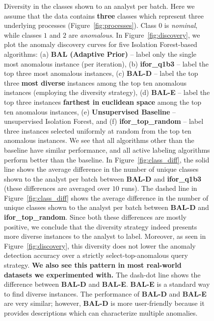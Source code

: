 \documentclass{article} %
\begin{document}
\begin{figure}
	\caption{Diversity in the classes shown to an analyst per batch. Here we assume that the data contains \textbf{three} classes which represent three underlying processes (Figure~\ref{fig:processes}). Class $0$ is \emph{nominal}, while classes $1$ and $2$ are \emph{anomalous}. In Figure~\ref{fig:discovery}, we plot the anomaly discovery curves for five Isolation Forest-based algorithms: (a) \textbf{BAL (Adaptive Prior)} -- label only the single most anomalous instance (per iteration), (b) \textbf{ifor\_q1b3} -- label the top three most anomalous instances, (c) \textbf{BAL-D} -- label the top three \textbf{most diverse} instances among the top ten anomalous instances (employing the diversity strategy), (d) \textbf{BAL-E} -- label the top three instances \textbf{farthest in euclidean space} among the top ten anomalous instances, (e) \textbf{Unsupervised Baseline} -- unsupervised Isolation Forest, and (f) \textbf{ifor\_top\_random} -- label three instances selected uniformly at random from the top ten anomalous instances. We see that all algorithms other than the baseline have similar performance, and all active labeling algorithms perform better than the baseline. In Figure~\ref{fig:class_diff}, the solid line shows the average difference in the number of unique classes shown to the analyst per batch between \textbf{BAL-D} and \textbf{ifor\_q1b3} (these differences are averaged over $10$ runs). The dashed line in Figure~\ref{fig:class_diff} shows the average difference in the number of unique classes shown to the analyst per batch between \textbf{BAL-D} and \textbf{ifor\_top\_random}. Since both these differences are mostly positive, we conclude that the diversity strategy indeed presents more diverse instances to the analyst to label. Moreover, as seen in Figure~\ref{fig:discovery}, this diversity does not lower the anomaly detection accuracy over a strictly select-top-anomalous query strategy. \textbf{We also see this pattern in most real-world datasets we experimented with.} The dash-dot line shows the difference between \textbf{BAL-D} and \textbf{BAL-E}. \textbf{BAL-E} is a standard way to find diverse instances. The performance of \textbf{BAL-D} and \textbf{BAL-E} are very similar; however, \textbf{BAL-D} is more user-friendly because it provides descriptions which can characterize multiple anomalies.} \label{fig:diverse_effect}
\end{figure}
\end{document}
